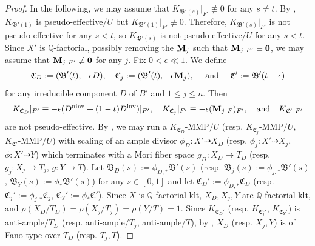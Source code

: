 \documentclass[11pt,reqno]{amsart}
\numberwithin{equation}{section}
\newcommand{\Mm}{{\bf{M}}}
\newcommand{\Cc}{\mathfrak{C}}
\newcommand{\ninv}{\operatorname{ninv}}
\newcommand{\inv}{\operatorname{inv}}
\newcommand{\Bb}{{\mathfrak{B}}}
\theoremstyle{definition}
\begin{document}
\begin{proof}
In the following, we may assume that $K_{\Bb'(s)}|_{F'}\not\equiv 0$ for any $s\neq t$. By \cite[Theorem~5.1]{Cas+25a}, $K_{\Bb'(1)}$ is pseudo-effective$/U$ but $K_{\Bb'(1)}|_{F'}\not\equiv 0$. Therefore, $K_{\Bb'(s)}|_{F'}$ is not pseudo-effective for any $s<t$, so $K_{\Bb'(s)}$ is not pseudo-effective$/U$ for any $s<t$. Since $X'$ is $\mathbb Q$-factorial, possibly removing the $\Mm_j$ such that $\Mm_j|_{F'}\equiv\bm{0}$, we may assume that $\Mm_j|_{F'}\not\equiv\bm{0}$ for any $j$. Fix $0<\epsilon\ll 1$. We define
$$\Cc_D:=(\Bb'(t),-\epsilon D),\quad \Cc_j:=(\Bb'(t),-\epsilon\Mm_j),\quad \text{ and }\quad \Cc':=\Bb'(t-\epsilon)$$
for any irreducible component $D$ of $B'$ and $1\leq j\leq n$. Then
$$K_{\Cc_D}|_{F'}\equiv -\epsilon(D^{\ninv}+(1-t)D^{\inv})|_{F'},\quad K_{\Cc_j}|_{F'}\equiv -\epsilon(\Mm_j|_F)_{F'},\quad \text{and}\quad K_{\Cc'}|_{F'}$$
are not pseudo-effective. By \cite[Theorem~2.1.5]{Cas+25a}, we may run a $K_{\Cc_D}$-MMP$/U$ (resp. $K_{\Cc_j}$-MMP$/U$, $K_{\Cc'}$-MMP$/U$) with scaling of an ample divisor $\phi_D: X'\dashrightarrow X_D$ (resp. $\phi_j: X'\dashrightarrow X_j$, $\phi\colon X'\dashrightarrow Y$) which terminates with a Mori fiber space $g_D: X_D\rightarrow T_D$ (resp. $g_j: X_j\rightarrow T_j$, $g: Y\rightarrow T$). Let $\Bb_D(s):=\phi_{D,*}\Bb'(s)$ (resp. $\Bb_j(s):=\phi_{j,*}\Bb'(s)$, $\Bb_Y(s):=\phi_{*}\Bb'(s)$) for any $s\in [0,1]$ and let $\Cc_D':=\phi_{D,*}\Cc_D$ (resp. $\Cc_j':=\phi_{j,*}\Cc_j$, $\Cc_Y':=\phi_{*}\Cc'$). Since $X$ is $\mathbb Q$-factorial klt, $X_D,X_j,Y$ are $\mathbb Q$-factorial klt, and $\rho(X_D/T_D)=\rho(X_j/T_j)=\rho(Y/T)=1$. Since $K_{\Cc_D'}$ (resp. $K_{\Cc_j'}$, $K_{\Cc_Y'}$) is anti-ample$/T_D$ (resp. anti-ample$/T_j$, anti-ample$/T$), by \cite[Theorem~9.2]{Cas+25a}, $X_D$ (resp. $X_j,Y$) is of Fano type over $T_D$ (resp. $T_j,T$). 


\end{proof}
\end{document}
